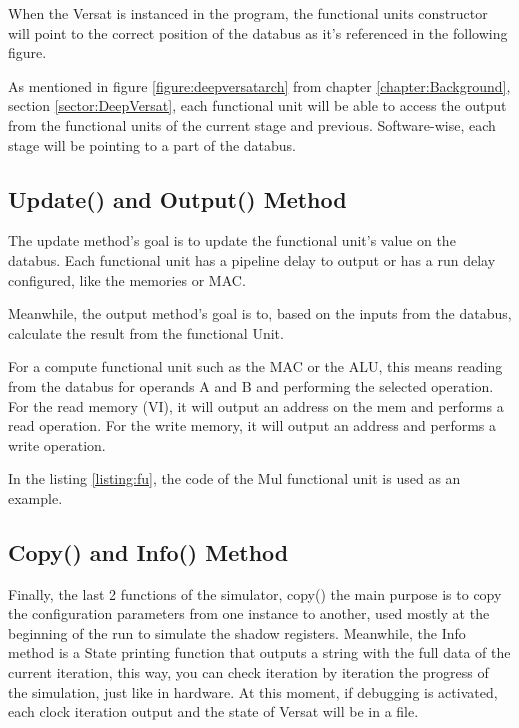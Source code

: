 When the Versat is instanced in the program, the functional units constructor will point
to the correct position of the databus as it's referenced in the following figure.

As mentioned in figure \ref{figure:deepversatarch} from chapter \ref{chapter:Background}, section \ref{sector:DeepVersat}, 
each functional unit will be able to access the output from the functional units of the
current stage and previous. Software-wise, each stage will be pointing to a part of the databus.  



\subsection{Update() and Output() Method}


The update method's goal is to update the functional unit's value on the databus. 
Each functional unit has a pipeline delay to output or has a run delay configured, 
like the memories or MAC.

Meanwhile, the output method's goal is to, based on the inputs from the databus, calculate the result from
 the functional Unit.

 For a compute functional unit such as the MAC or the ALU, this means reading from the databus for operands A and B
 and performing the selected operation. For the read memory (VI), it will output an address on the mem
 and performs a read operation. For the write memory, it will output an address and performs a write operation.

 In the listing \ref{listing:fu}, the code of the Mul functional unit is used as an example.

 \newpage
 


\subsection{Copy() and Info() Method}

Finally, the last 2 functions of the simulator, copy() the main purpose is to copy the configuration parameters from one instance to another,
used mostly at the beginning of the run to simulate the shadow registers.
Meanwhile, the Info method is a State printing function that outputs a string with the full data of the current iteration,
this way, you can check iteration by iteration the progress of the simulation, just like in hardware.
At this moment, if debugging is activated, each clock iteration output and the state of Versat will be in a file.


